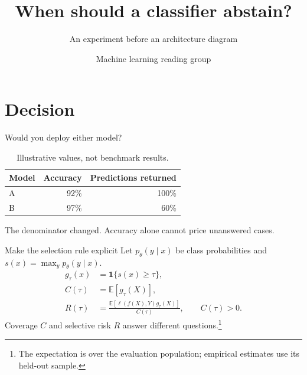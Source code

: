\documentclass[10pt,aspectratio=169]{beamer}
\title{When should a classifier abstain?}
\subtitle{An experiment before an architecture diagram}
\author{Machine learning reading group}
\date{}
\begin{document}
\maketitle
\section{Decision}
\begin{frame}{Would you deploy either model?}
\begin{table}\centering
\begin{tabular}{lrr}\toprule
Model & Accuracy & Predictions returned\\\midrule
A & 92\% & 100\%\\
B & 97\% & 60\%\\\bottomrule
\end{tabular}
\caption{Illustrative values, not benchmark results.}
\end{table}
\pause
\alert{The denominator changed.} Accuracy alone cannot price unanswered cases.
\end{frame}
\begin{frame}{Make the selection rule explicit}
Let $p_\theta(y\mid x)$ be class probabilities and $s(x)=\max_y p_\theta(y\mid x)$.
\begin{align*}
 g_\tau(x)&=\mathbf{1}\{s(x)\geq\tau\},\\
 C(\tau)&=\mathbb{E}[g_\tau(X)],\\
 R(\tau)&=\frac{\mathbb{E}[\ell(f(X),Y)g_\tau(X)]}{C(\tau)},\qquad C(\tau)>0.
\end{align*}
Coverage $C$ and selective risk $R$ answer different questions.\footnote{The expectation is over the evaluation population; empirical estimates use its held-out sample.}
\end{frame}
\end{document}
